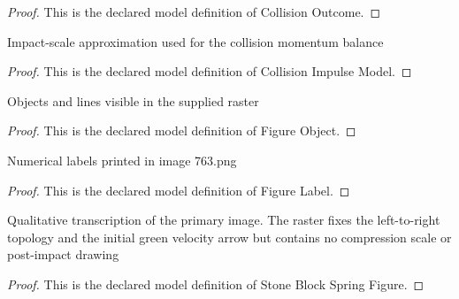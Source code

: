 \begin{proof}
  This is the declared model definition of Collision Outcome.
\end{proof}
\begin{definition}
  \label{def:physics:phyx-mini-0763:phyxminiproblems-problemphyxmini0763-collisionimpulsemodel}
  Impact-scale approximation used for the collision momentum balance
\end{definition}
\begin{proof}
  This is the declared model definition of Collision Impulse Model.
\end{proof}
\begin{definition}
  \label{def:physics:phyx-mini-0763:phyxminiproblems-problemphyxmini0763-figureobject}
  Objects and lines visible in the supplied raster
\end{definition}
\begin{proof}
  This is the declared model definition of Figure Object.
\end{proof}
\begin{definition}
  \label{def:physics:phyx-mini-0763:phyxminiproblems-problemphyxmini0763-figurelabel}
  Numerical labels printed in image 763.png
\end{definition}
\begin{proof}
  This is the declared model definition of Figure Label.
\end{proof}
\begin{definition}
  \label{def:physics:phyx-mini-0763:phyxminiproblems-problemphyxmini0763-stoneblockspringfigure}
  Qualitative transcription of the primary image. The raster fixes the left-to-right topology and the initial green velocity arrow but contains no compression scale or post-impact drawing
\end{definition}
\begin{proof}
  This is the declared model definition of Stone Block Spring Figure.
\end{proof}
